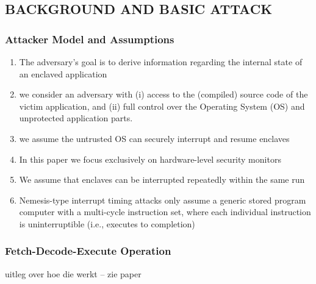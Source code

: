 \documentclass{article}
\begin{document}
\subsection{BACKGROUND AND BASIC ATTACK}
\subsubsection{Attacker Model and Assumptions}
\begin{enumerate}
\item The adversary’s goal is to derive information regarding the internal
state of an enclaved application
\item we consider an adversary with (i) access to the (compiled) source code of the victim application,
and (ii) full control over the Operating System (OS) and unprotected application parts.
\item we assume the untrusted OS can securely interrupt and resume enclaves
\item In this paper we focus exclusively on hardware-level security monitors
\item We assume that enclaves can be interrupted repeatedly within the same run
\item Nemesis-type interrupt timing attacks only assume a generic stored program
computer with a multi-cycle instruction set, where each individual instruction is uninterruptible (i.e., executes to completion)
\end{enumerate}

\subsubsection{Fetch-Decode-Execute Operation}
uitleg over hoe die werkt -- zie paper
\end{document}
